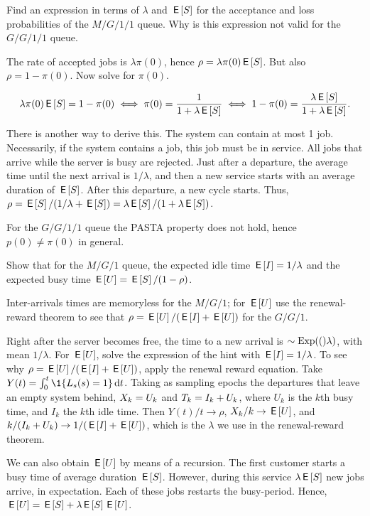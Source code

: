 \begin{exercise}
Find an expression in terms of $\lambda$ and $\,\mathsf{E}\left[S\right]$ for the acceptance and loss probabilities of  the $M/G/1/1$ queue.
Why is this expression not valid for the $G/G/1/1$ queue.
\begin{hint}
 The rate of accepted jobs is $\lambda \pi(0)$, hence $\rho= \lambda \pi(0) \,\mathsf{E}\left[S\right]$.
But also $\rho = 1-\pi(0)$.  Now solve for $\pi(0)$.
\end{hint}
\begin{solution}
 \begin{equation*}
 \lambda\pi(0) \,\mathsf{E}\left[S\right] = 1 - \pi(0) \iff \pi(0)=\frac1{1+\lambda\,\mathsf{E}\left[S\right]}
\iff 1-\pi(0) = \frac{\lambda \,\mathsf{E}\left[S\right]}{1+\lambda \,\mathsf{E}\left[S\right]}.
 \end{equation*}

 There is another way to derive this.
 The system can contain at most 1 job.
 Necessarily, if the system contains a job, this job must be in service.
 All jobs that arrive while the server is busy are rejected.
 Just after a departure, the average time until the next arrival is $1/\lambda$, and then a new service starts with an average duration of $\,\mathsf{E}\left[S\right]$.
 After this departure, a new cycle starts.
 Thus, $\rho = \,\mathsf{E}\left[S\right]/(1/\lambda + \,\mathsf{E}\left[S\right]) = \lambda \,\mathsf{E}\left[S\right]/ (1 + \lambda \,\mathsf{E}\left[S\right])$.


For the $G/G/1/1$ queue the PASTA property does not hold, hence $p(0)\neq \pi(0)$ in general.
\end{solution}
\end{exercise}


\begin{exercise}\label{ex:57}
 Show that for the $M/G/1$ queue, the expected idle time
 $\,\mathsf{E}\left[I\right] = 1/\lambda$ and the expected busy time $\,\mathsf{E}\left[U\right] = \,\mathsf{E}\left[S\right]/(1-\rho)$.
\begin{hint}
 Inter-arrivals times  are memoryless for the $M/G/1$; for $\,\mathsf{E}\left[U\right]$ use the renewal-reward theorem to see that  $\rho = \,\mathsf{E}\left[U\right]/(\,\mathsf{E}\left[I\right] + \,\mathsf{E}\left[U\right])$ for the $G/G/1$.
\end{hint}
\begin{solution}
  Right after the server becomes free, the time to a new arrival is $\sim\mathrm{Exp}(()\lambda)$, with mean $1/\lambda$.
  For $\,\mathsf{E}\left[U\right]$, solve the expression of the hint with $\,\mathsf{E}\left[I\right] = 1/\lambda$.
  To see why $\rho = \,\mathsf{E}\left[U\right]/(\,\mathsf{E}\left[I\right] + \,\mathsf{E}\left[U\right])$, apply the renewal reward equation.
  Take $Y(t) = \int_0^t \1{\Ls(s)=1} \d t$.
  Taking as sampling epochs the departures that leave an empty system behind, $X_k = U_k$ and $T_k = I_k + U_k$, where $U_k$ is the $k$th busy time, and $I_k$ the $k$th idle time.
Then $Y(t)/ t\to\rho$, $X_k/k \to \,\mathsf{E}\left[U\right]$, and $k/(I_k + U_k) \to 1/(\,\mathsf{E}\left[I\right] + \,\mathsf{E}\left[U\right])$, which is the $\lambda$ we use in the renewal-reward theorem.

We can also obtain $\,\mathsf{E}\left[U\right]$ by means of a recursion. The first customer starts a busy time of average duration $\,\mathsf{E}\left[S\right]$. However, during this service $\lambda \,\mathsf{E}\left[S\right]$ new jobs arrive, in expectation. Each of these jobs restarts the busy-period. Hence, $\,\mathsf{E}\left[U\right] = \,\mathsf{E}\left[S\right] + \lambda \,\mathsf{E}\left[S\right] \,\mathsf{E}\left[U\right]$.
\end{solution}
\end{exercise}




